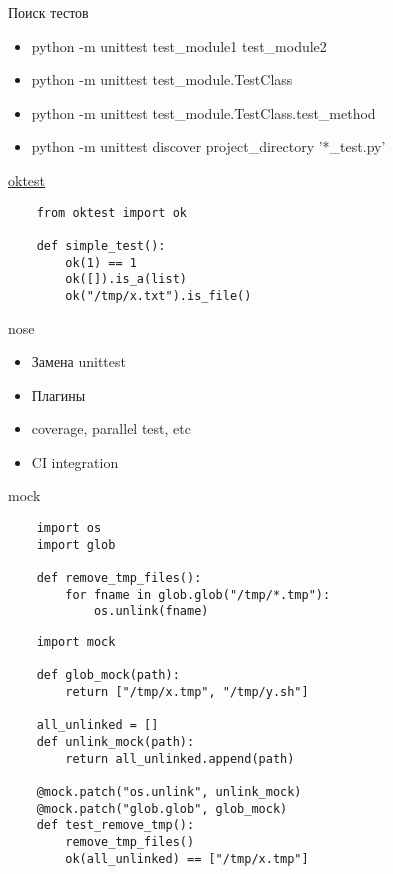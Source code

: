 \documentclass{article}
\begin{document}
\begin{center}Поиск тестов\end{center}
\begin{itemize}
	\item python -m unittest test\_module1 test\_module2
	\item python -m unittest test\_module.TestClass
	\item python -m unittest test\_module.TestClass.test\_method
	\item python -m unittest discover project\_directory '*\_test.py'
\end{itemize}
\newpage

\begin{center} \href{http://www.kuwata-lab.com/oktest/oktest-py_users-guide.html}{oktest} \end{center}
\begin{lstlisting}
	from oktest import ok

	def simple_test():
		ok(1) == 1
		ok([]).is_a(list)
		ok("/tmp/x.txt").is_file()
\end{lstlisting}
\newpage

\begin{center}nose\end{center}
\begin{itemize}
	\item Замена unittest
	\item Плагины
	\item coverage, parallel test, etc
	\item CI integration
\end{itemize}
\newpage

\begin{center} mock \end{center}
\begin{lstlisting}
	import os
	import glob

	def remove_tmp_files():
		for fname in glob.glob("/tmp/*.tmp"):
			os.unlink(fname)
\end{lstlisting}
\newpage

\begin{center}\end{center}
\begin{lstlisting}
	import mock

	def glob_mock(path):
		return ["/tmp/x.tmp", "/tmp/y.sh"]

	all_unlinked = []
	def unlink_mock(path):
		return all_unlinked.append(path)

	@mock.patch("os.unlink", unlink_mock)
	@mock.patch("glob.glob", glob_mock)
	def test_remove_tmp():
		remove_tmp_files()
		ok(all_unlinked) == ["/tmp/x.tmp"]
\end{lstlisting}
\newpage
\end{document}
